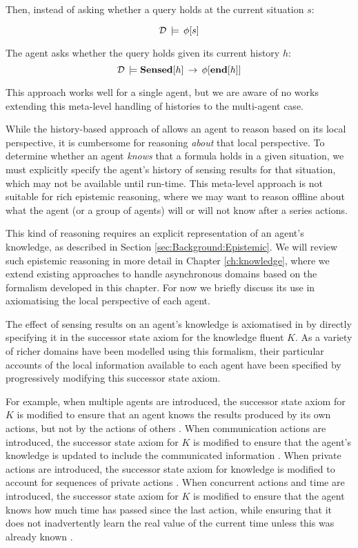 Then, instead of asking whether a query holds at the current situation
$s$:

\[
\mathcal{D}\,\models\,\phi[s]\]


The agent asks whether the query holds given its current history $h$:\[
\mathcal{D}\,\models\mathbf{Sensed}[h]\,\rightarrow\,\phi[\mathbf{end}[h]]\]


This approach works well for a single agent, but we are aware of no
works extending this meta-level handling of histories to the multi-agent
case.

While the history-based approach of \citep{giacomo99indigolog} allows
an agent to reason based on its local perspective, it is cumbersome
for reasoning \emph{about} that local perspective. To determine whether
an agent \emph{knows} that a formula holds in a given situation, we
must explicitly specify the agent's history of sensing results for
that situation, which may not be available until run-time. This meta-level
approach is not suitable for rich epistemic reasoning, where we may
want to reason offline about what the agent (or a group of agents)
will or will not know after a series actions.

This kind of reasoning requires an explicit representation of an agent's
knowledge, as described in Section \ref{sec:Background:Epistemic}.
We will review such epistemic reasoning in more detail in Chapter
\ref{ch:knowledge}, where we extend existing approaches to handle
asynchronous domains based on the formalism developed in this chapter.
For now we briefly discuss its use in axiomatising the local perspective
of each agent.

The effect of sensing results on an agent's knowledge is axiomatised
in \citep{scherl03sc_knowledge} by directly specifying it in the
successor state axiom for the knowledge fluent $K$. As a variety
of richer domains have been modelled using this formalism, their particular
accounts of the local information available to each agent have been
specified by progressively modifying this successor state axiom.

For example, when multiple agents are introduced, the successor state
axiom for $K$ is modified to ensure that an agent knows the results
produced by its own actions, but not by the actions of others \citep{shapiro98specifying_ma_systems}.
When communication actions are introduced, the successor state axiom
for $K$ is modified to ensure that the agent's knowledge is updated
to include the communicated information \citep{shapiro01casl_feat_inter,shapiro07sc_goal_change}.
When private actions are introduced, the successor state axiom for
knowledge is modified to account for sequences of private actions
\citep{Lesperance99sitcalc_approach}. When concurrent actions and
time are introduced, the successor state axiom for $K$ is modified
to ensure that the agent knows how much time has passed since the
last action, while ensuring that it does not inadvertently learn the
real value of the current time unless this was already known \citep{scherl03conc_knowledge}.

